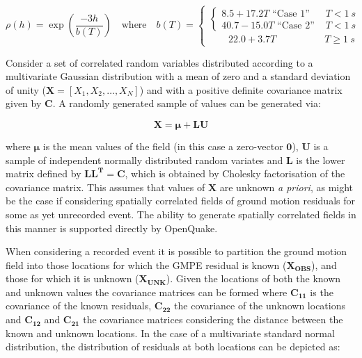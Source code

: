 \begin{equation}
\rho \left( h \right) = \exp\left( {\frac{-3h}{b \left( T \right)}} \right) \quad \text{where} \quad b \left( T \right) = \begin{cases}\begin{cases}
8.5 + 17.2 T \text{ ``Case 1'' } & T < 1\ s\\
40.7 - 15.0 T \text{ ``Case 2'' } & T < 1\ s\end{cases}&\\
\qquad 22.0 + 3.7 T \qquad\qquad\quad T \geq 1\ s&
\end{cases}
\label{eq:jayarambaker}
\end{equation}

Consider a set of correlated random variables distributed according to a multivariate Gaussian distribution with a mean of zero and a standard deviation of unity ($\mathbf{X} = \left[ {X_1, X_2, \ldots , X_N} \right]$) and with a positive definite covariance matrix given by $\mathbf{C}$. A randomly generated sample of values can be generated via:

\begin{equation}
\mathbf{X} = \mathbf{\mu} + \mathbf{LU}
\end{equation}

\noindent where $\mathbf{\mu}$ is the mean values of the field (in this case a zero-vector $\mathbf{0}$), $\mathbf{U}$ is a sample of independent normally distributed random variates and $\mathbf{L}$ is the lower matrix defined by $\mathbf{LL^T} = \mathbf{C}$, which is obtained by Cholesky factorisation of the covariance matrix. This assumes that values of $\mathbf{X}$ are unknown \emph{a priori}, as might be the case if considering spatially correlated fields of ground motion residuals for some as yet unrecorded event. The ability to generate spatially correlated fields in this manner is supported directly by OpenQuake.

When considering a recorded event it is possible to partition the ground motion field into those locations for which the GMPE residual is known ($\mathbf{X_{OBS}}$), and those for which it is unknown ($\mathbf{X_{UNK}}$). Given the locations of both the known and unknown values the covariance matrices can be formed where $\mathbf{C_{11}}$ is the covariance of the known residuals, $\mathbf{C_{22}}$ the covariance of the unknown locations and $\mathbf{C_{12}}$ and $\mathbf{C_{21}}$ the covariance matrices considering the distance between the known and unknown locations. In the case of a multivariate standard normal distribution, the distribution of residuals at both locations can be depicted as:

